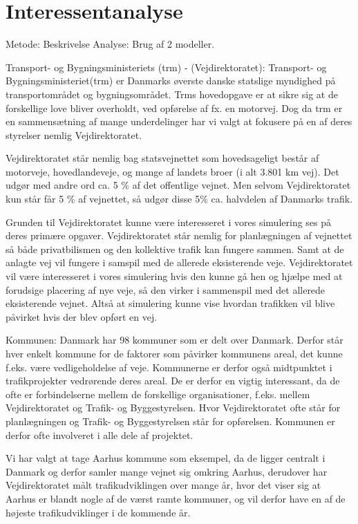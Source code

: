 \chapter{Interessentanalyse}\label{Interessentanalyse}

Metode:
Beskrivelse
Analyse:
Brug af 2 modeller.


Transport- og Bygningsministeriets (trm) - (Vejdirektoratet):
Transport- og Bygningsministeriet(trm) er Danmarks øverste danske statslige myndighed på transportområdet og bygningsområdet. Trms hovedopgave er at sikre sig at de forskellige love bliver overholdt, ved opførelse af fx. en motorvej. Dog da trm er en sammensætning af mange underdelinger har vi valgt at fokusere på en af deres styrelser nemlig Vejdirektoratet.
 
Vejdirektoratet står nemlig bag statsvejnettet som hovedsageligt består af motorveje, hovedlandeveje, og mange af landets broer (i alt 3.801 km vej). Det udgør med andre ord ca. 5 \% af det offentlige vejnet. Men selvom Vejdirektoratet kun står får 5 \% af vejnettet, så udgør disse 5\% ca. halvdelen af Danmarks trafik.

Grunden til Vejdirektoratet kunne være interesseret i vores simulering ses på deres primære opgaver. Vejdirektoratet står nemlig for planlægningen af vejnettet så både privatbilismen og den kollektive trafik kan fungere sammen. Samt at de anlagte vej vil fungere i samspil med de allerede eksisterende veje.
Vejdirektoratet vil være interesseret i vores simulering hvis den kunne gå hen og hjælpe med at forudsige placering af nye veje, så den virker i sammenspil med det allerede eksisterende vejnet. Altså at simulering kunne vise hvordan trafikken vil blive påvirket hvis der blev opført en vej.

Kommunen:
Danmark har 98 kommuner som er delt over Danmark. Derfor står hver enkelt kommune for de faktorer som påvirker kommunens areal, det kunne f.eks. være vedligeholdelse af veje. Kommunerne er derfor også midtpunktet i trafikprojekter vedrørende deres areal. De er derfor en vigtig interessant, da de ofte er forbindelserne mellem de forskellige organisationer, f.eks. mellem Vejdirektoratet og Trafik- og Byggestyrelsen. Hvor Vejdirektoratet ofte står for planlægningen og Trafik- og Byggestyrelsen står for opførelsen. Kommunen er derfor ofte involveret i alle dele af projektet.

Vi har valgt at tage Aarhus kommune som eksempel, da de ligger centralt i Danmark og derfor samler mange vejnet sig omkring Aarhus, derudover har Vejdirektoratet målt trafikudviklingen over mange år, hvor det viser sig at Aarhus er blandt nogle af de værst ramte kommuner, og vil derfor have en af de højeste trafikudviklinger i de kommende år. 


